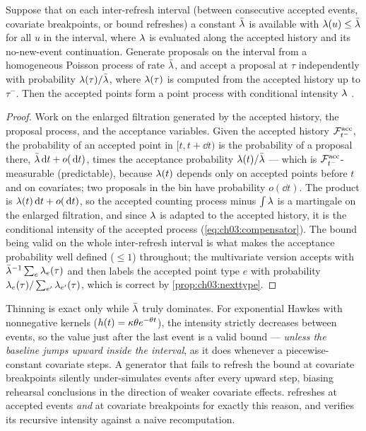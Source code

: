 \begin{proposition}\label{prop:ch03:thinning}
Suppose that on each inter-refresh interval (between consecutive accepted
events, covariate breakpoints, or bound refreshes) a constant
$\bar{\lambda}$ is available with $\lambda(u) \le \bar{\lambda}$ for all $u$ in the
interval, where $\lambda$ is evaluated along the accepted history and its
no-new-event continuation. Generate proposals on the interval from a
homogeneous Poisson process of rate $\bar{\lambda}$, and accept a proposal at
$\tau$ independently with probability $\lambda(\tau)/\bar{\lambda}$, where
$\lambda(\tau)$ is computed from the accepted history up to $\tau^-$. Then
the accepted points form a point process with conditional intensity
$\lambda$ \citep{lewisshedler1979,ogata1981}.
\end{proposition}

\begin{proof}
Work on the enlarged filtration generated by the accepted history, the
proposal process, and the acceptance variables. Given the accepted history
$\mathcal{F}^{\mathrm{acc}}_{t^-}$, the probability of an accepted point in
$[t, t+\dd t)$ is the probability of a proposal there,
$\bar{\lambda}\,\mathrm{d} t + o(\,\mathrm{d} t)$, times the acceptance probability
$\lambda(t)/\bar{\lambda}$ --- which is $\mathcal{F}^{\mathrm{acc}}_{t^-}$-measurable
(predictable), because $\lambda(t)$ depends only on accepted points before
$t$ and on covariates; two proposals in the bin have probability
$o(\dd t)$. The product is $\lambda(t)\,\mathrm{d} t + o(\,\mathrm{d} t)$, so the accepted
counting process minus $\int \lambda$ is a martingale on the enlarged
filtration, and since $\lambda$ is adapted to the accepted history, it is
the conditional intensity of the accepted process
(\cref{eq:ch03:compensator}). The bound being valid on the whole
inter-refresh interval is what makes the acceptance probability well
defined ($\le 1$) throughout; the multivariate version accepts with
$\bar{\lambda}^{-1}\sum_e \lambda_e(\tau)$ and then labels the accepted point type
$e$ with probability $\lambda_e(\tau)/\sum_{e'}\lambda_{e'}(\tau)$, which is
correct by \cref{prop:ch03:nexttype}.
\end{proof}

\begin{warning}\label{warn:ch03:bound}
Thinning is exact only while $\bar{\lambda}$ truly dominates. For exponential
Hawkes with nonnegative kernels ($h(t) = \kappa\theta
e^{-\theta t}$), the intensity strictly decreases between events, so the
value just after the last event is a valid bound --- \emph{unless the
baseline jumps upward inside the interval}, as it does whenever a
piecewise-constant covariate steps. A generator that fails to refresh the
bound at covariate breakpoints silently under-simulates events after
every upward step, biasing rehearsal conclusions in the direction of
weaker covariate effects.  refreshes at
accepted events \emph{and} at covariate breakpoints for exactly this
reason, and verifies its recursive intensity against a naive
recomputation.
\end{warning}

